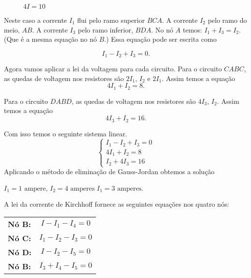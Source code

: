 \begin{figure}[!h]
    \centering
    
    \caption{$4I = 10$}
\end{figure}

\begin{figure}[!h]
    \centering
    
\end{figure}

Neste caso a corrente $I_1$ flui pelo ramo superior $BCA$. A corrente $I_2$ pelo ramo do meio, $AB$. A corrente $I_3$ pelo ramo inferior, $BDA$. No nó $A$ temos: $I_1 + I_3 = I_2$. (Que é a mesma equação no nó $B$.)  Essa equação pode ser escrita como

\[
    I_1 - I_2 + I_3 = 0.
\]


Agora vamos aplicar a lei da voltagem para cada circuito. Para o circuito $CABC$, as quedas de voltagem nos resistores são $2I_1$, $I_2$ e $2I_1$. Assim temos a equação
\[
    4I_1 + I_2 = 8.
\]

Para o circuito $DABD$, as quedas de voltagem nos resistores são $4I_3$, $I_2$. Assim temos a equação
\[
    4I_3 + I_2 = 16.
\]

Com isso temos o seguinte sistema linear.
\[
    \begin{cases}
        I_1 - I_2 + I_3 = 0\\
        4I_1 + I_2 = 8\\
        I_2 + 4I_3 = 16
    \end{cases}
\]
Aplicando o método de eliminação de Gauss-Jordan obtemos a solução
\begin{center}
    $I_1 = 1 \mbox{ ampere}$, $I_2 = 4 \mbox{ amperes}$ $I_1 = 3 \mbox{ amperes}$.
\end{center}

\begin{figure}[!h]
    \centering
    
\end{figure}

A lei da corrente de Kirchhoff fornece as seguintes equações nos quatro nós:
\begin{center}
    \begin{tabular}{lc}
        \textbf{Nó B:} & $I - I_1 - I_4 = 0$\\
        \textbf{Nó C:} & $I_1 - I_2 - I_3 = 0$\\
        \textbf{Nó D:} & $I - I_2 - I_5 = 0$\\
        \textbf{Nó B:}& $I_3 + I_4 - I_5 = 0$
    \end{tabular}
\end{center}

